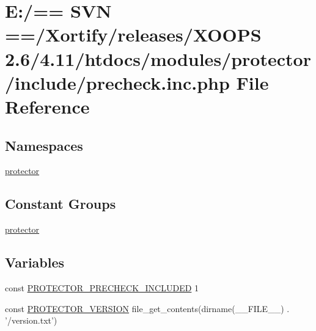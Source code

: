 \hypertarget{precheck_8inc_8php}{\section{E\-:/== S\-V\-N ==/\-Xortify/releases/\-X\-O\-O\-P\-S 2.6/4.11/htdocs/modules/protector/include/precheck.inc.\-php File Reference}
\label{precheck_8inc_8php}
}
\subsection*{Namespaces}
\begin{DoxyCompactItemize}
\item 
\hyperlink{namespaceprotector}{protector}
\end{DoxyCompactItemize}
\subsection*{Constant Groups}
\begin{DoxyCompactItemize}
\item 
\hyperlink{namespaceprotector}{protector}
\end{DoxyCompactItemize}
\subsection*{Variables}
\begin{DoxyCompactItemize}
\item 
const \hyperlink{precheck_8inc_8php_afa319326ba67c00cadcdc82ac772a5d2}{P\-R\-O\-T\-E\-C\-T\-O\-R\-\_\-\-P\-R\-E\-C\-H\-E\-C\-K\-\_\-\-I\-N\-C\-L\-U\-D\-E\-D} 1
\item 
const \hyperlink{precheck_8inc_8php_a7e97813f6f2bef74ab21ee200405c773}{P\-R\-O\-T\-E\-C\-T\-O\-R\-\_\-\-V\-E\-R\-S\-I\-O\-N} file\-\_\-get\-\_\-contents(dirname(\-\_\-\-\_\-\-F\-I\-L\-E\-\_\-\-\_\-) . '/version.\-txt')
\end{DoxyCompactItemize}



